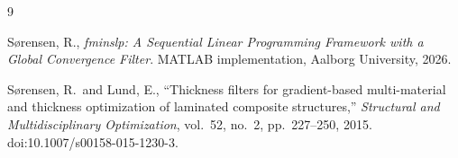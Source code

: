 \documentclass[11pt,a4paper]{article}
\begin{document}
\begin{thebibliography}{9}

S{\o}rensen, R.,
\textit{fminslp: A Sequential Linear Programming Framework with a
Global Convergence Filter}.
MATLAB implementation, Aalborg University, 2026.

S{\o}rensen, R.\ and Lund, E.,
``Thickness filters for gradient-based multi-material and thickness
optimization of laminated composite structures,''
\textit{Structural and Multidisciplinary Optimization},
vol.~52, no.~2, pp.~227--250, 2015.
doi:10.1007/s00158-015-1230-3.

\end{thebibliography}
\end{document}

